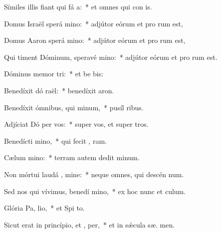 \item Símiles illis fiant qui fá a:~* et omnes qui con  is.
\item Domus Israël sperá  mino:~* adjútor eórum et pro rum est,
\item Domus Aaron sperá  mino:~* adjútor eórum et pro rum est,
\item Qui timent Dóminum, speravé  mino:~* adjútor eórum et pro rum est.
\item Dóminus memor  tri:~* et be bis:
\item Benedíxit dó raël:~* benedíxit  aron.
\item Benedíxit ómnibus, qui  minum,~* pusíl  ribus.
\item Adjíciat Dó per vos:~* super vos, et super  tros.
\item Benedícti   mino,~* qui fecit ,  ram.
\item Cælum  mino:~* terram autem dedit  minum.
\item Non mórtui laudá , mine:~* neque omnes, qui descén  num.
\item Sed nos qui vívimus, benedí mino,~* ex hoc nunc et   culum.
\item Glória Pa,  lio,~* et Spi to.
\item Sicut erat in princípio, et ,  per,~* et in sǽcula sæ. men.
